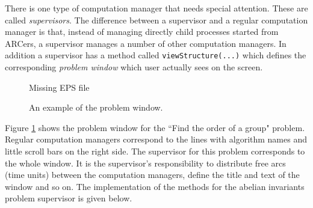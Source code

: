 \documentclass[12pt]{article}
\begin{document}
There is one type of computation manager that needs special attention.
These are called {\em supervisors}.
The difference between a supervisor and a regular
computation manager is that,
instead of managing directly child processes started from ARCers,
a supervisor manages a number of other computation managers. In addition
a supervisor has
a method called {\tt viewStructure(...)} which defines the corresponding
{\em problem window} which user actually sees on the screen.

\begin{figure}[h]
\centerline{ Missing EPS file }
\caption{An example of the problem window.}
\label{OPWin}
\end{figure}

Figure \ref{OPWin} shows the problem window for the ``Find the order of a
group" problem. Regular computation managers correspond to the lines 
with algorithm
names and little scroll bars on the right side. The supervisor for this problem
corresponds to the whole window.
It is the supervisor's responsibility to distribute free arcs (time units)
between the computation managers, define the title and text of the 
window and so
on.  The implementation of the methods for the abelian invariants problem
supervisor is given below.
\end{document}
